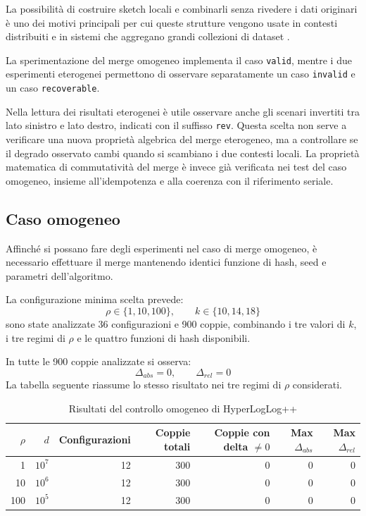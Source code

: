 La possibilità di costruire sketch locali e combinarli senza rivedere i dati
originari è uno dei motivi principali per cui queste strutture vengono usate in
contesti distribuiti e in sistemi che aggregano grandi collezioni di dataset
\cite{Agarwal_Cormode_Huang_Phillips_Wei_Yi_2012,Ting_2019_BillionsDatasets}.

La sperimentazione del merge omogeneo implementa il caso \texttt{valid}, 
mentre i due esperimenti
eterogenei permettono di osservare separatamente un caso \texttt{invalid} e un
caso \texttt{recoverable}.

 Nella lettura dei risultati eterogenei è utile osservare anche gli scenari
  invertiti tra lato sinistro e lato destro, indicati con il suffisso
  \texttt{rev}. Questa scelta non serve a verificare una nuova proprietà
  algebrica del merge eterogeneo, ma a controllare se il degrado osservato cambi
  quando si scambiano i due contesti locali. La proprietà matematica di
  commutatività del merge è invece già verificata nei test del caso omogeneo,
  insieme all'idempotenza e alla coerenza con il riferimento seriale.

\subsection{Caso omogeneo}
Affinch\'e si possano fare degli esperimenti nel caso di merge omogeneo, \`e
necessario effettuare il merge mantenendo identici funzione di hash, seed e parametri dell'algoritmo.

La configurazione minima scelta prevede:
\[
\rho \in \{1,10,100\},\qquad
k \in \{10,14,18\}
\]
sono state analizzate 36 configurazioni e 900 coppie, combinando i tre valori
di \(k\), i tre regimi di \(\rho\) e le quattro funzioni di hash disponibili.

In tutte le 900 coppie analizzate si osserva:
\[
\Delta_{abs}=0,\qquad \Delta_{rel}=0
\]
La tabella seguente riassume lo stesso risultato nei tre regimi di \(\rho\)
considerati.

\begin{table}[htbp]
    \centering
    \small
    \setlength{\tabcolsep}{6pt}
    \renewcommand{\arraystretch}{1.1}
    \begin{tabular}{|r|r|r|r|r|r|r|}
        \hline
        \(\rho\) & \(d\) & Configurazioni & Coppie totali & Coppie con delta \(\neq 0\) & Max \(\Delta_{abs}\) & Max \(\Delta_{rel}\) \\
        \hline
        1 & \(10^7\) & 12 & 300 & 0 & 0 & 0 \\
        \hline
        10 & \(10^6\) & 12 & 300 & 0 & 0 & 0 \\
        \hline
        100 & \(10^5\) & 12 & 300 & 0 & 0 & 0 \\
        \hline
    \end{tabular}
    \caption{Risultati del controllo omogeneo di HyperLogLog++}
    \label{tab:ch5-merge-homo-summary}
\end{table}

